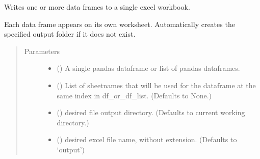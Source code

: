 \documentclass[a4paper,10pt,english]{sphinxmanual}
\begin{document}
\begin{fulllineitems}
\label{\detokenize{io_functions:io_functions.write_to_excel}}
Writes one or more data frames to a single excel workbook.

Each data frame appears on its own worksheet. Automatically creates the
specified output folder if it does not exist.
\begin{quote}\begin{description}
\item[{Parameters}] \leavevmode\begin{itemize}
\item {} 
 () \textendash{} A single pandas dataframe or list
of pandas dataframes.

\item {} 
 (\sphinxstyleliteralemphasis{\sphinxupquote{, }}) \textendash{} List of sheetnames that will be used for
the dataframe at the same index in df\_or\_df\_list.
(Defaults to None.)

\item {} 
 (\sphinxstyleliteralemphasis{\sphinxupquote{, }}) \textendash{} desired file output directory.
(Defaults to current working directory.)

\item {} 
 (\sphinxstyleliteralemphasis{\sphinxupquote{, }}) \textendash{} desired excel file name, without extension.
(Defaults to ‘output’)

\end{itemize}

\end{description}\end{quote}

\end{fulllineitems}
\end{document}

